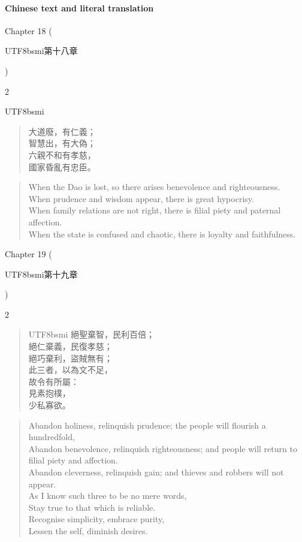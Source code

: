 \paragraph{Chinese text and literal translation}


Chapter 18 (\begin{CJK*}{UTF8}{bsmi}第十八章\end{CJK*})
\begin{paracol}{2}
\begin{CJK*}{UTF8}{bsmi}
\begin{verse}
大道廢，有仁義；\\ 智慧出，有大偽；\\ 六親不和有孝慈，\\ 國家昏亂有忠臣。
\end{verse}
\end{CJK*}
\switchcolumn
\begin{verse}
When the Dao is lost, so there arises benevolence and righteousness.\\ When prudence and wisdom appear, there is great hypocrisy.\\ When family relations are not right, there is filial piety and paternal affection.\\ When the state is confused and chaotic, there is loyalty and faithfulness.
\end{verse}
\end{paracol}


Chapter 19 (\begin{CJK*}{UTF8}{bsmi}第十九章\end{CJK*})
\begin{paracol}{2}
\begin{verse}
\begin{CJK*}{UTF8}{bsmi}
絕聖棄智，民利百倍；\\ 絕仁棄義，民復孝慈；\\ 絕巧棄利，盜賊無有；\\ 此三者，以為文不足，\\ 故令有所屬：\\ 見素抱樸，\\ 少私寡欲。
\end{CJK*}
\end{verse}
\switchcolumn
\vspace*{-.2em}
\begin{verse}
Abandon holiness, relinquish prudence; the people will flourish a hundredfold,\\ Abandon benevolence, relinquish righteousness; and people will return to filial piety and affection.\\ Abandon cleverness, relinquish gain; and thieves and robbers will not appear.\\ As I know such three to be no mere words,\\ Stay true to that which is reliable.\\ Recognise simplicity, embrace purity, \\ Lessen the self, diminish desires.
\end{verse}
\end{paracol}


